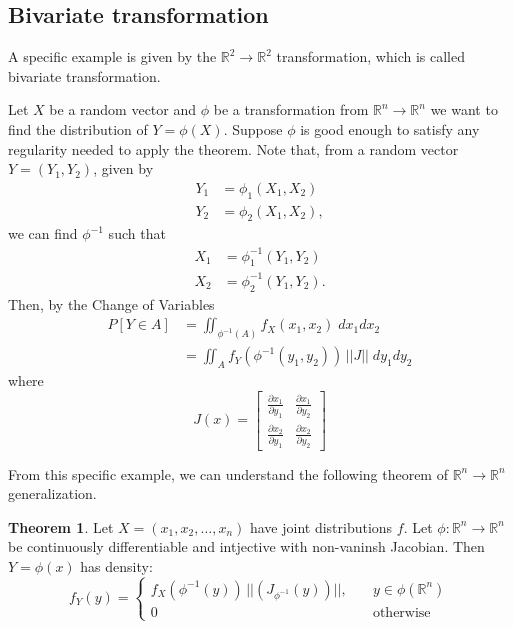 \documentclass[twoside]{article}
\theoremstyle{definition}
\newtheorem{theorem}{Theorem}[section]
\theoremstyle{remark}
\theoremstyle{remark}
\begin{document}
\subsection{Bivariate transformation}
A specific example is given by the $\mathbb{R}^2 \rightarrow \mathbb{R}^2$ transformation,
which is called bivariate transformation.

Let $X$ be a random vector and $\phi$ be a transformation from $\mathbb{R}^n \rightarrow \mathbb{R}^n$
we want to find the distribution of $Y=\phi(X)$. Suppose $\phi$ is good enough
to satisfy any regularity needed to apply the theorem.
Note that, from a random vector $Y = (Y_1, Y_2)$, given by
\begin{equation}
  \begin{split}
    Y_1 &= \phi_1(X_1, X_2) \\
    Y_2 &= \phi_2(X_1, X_2),
  \end{split}
\end{equation}
we can find $\phi^{-1}$ such that
\begin{equation}
  \begin{split}
    X_1 &= \phi^{-1}_1 (Y_1, Y_2) \\
    X_2 &= \phi^{-1}_2 (Y_1, Y_2).
  \end{split}
\end{equation}
Then, by the Change of Variables
\begin{equation}
  \begin{split}
    P[Y \in A]
    &= \iint_{\phi^{-1}(A)} f_X(x_1, x_2) \; dx_1 dx_2 \\
    &= \iint_{A} f_Y(\phi^{-1}(y_1, y_2)) \, ||J|| \; dy_1 dy_2
  \end{split}
\end{equation}
where
\begin{equation}
  J(x) =
    \begin{bmatrix}
      \frac{\partial x_1}{\partial y_1} & \frac{\partial x_1}{\partial y_2} \\
      \frac{\partial x_2}{\partial y_1} & \frac{\partial x_2}{\partial y_2}
    \end{bmatrix}
\end{equation}

From this specific example, we can understand the following theorem of
$\mathbb{R}^n \rightarrow \mathbb{R}^n$ generalization.
\begin{theorem}
  Let $X = (x_1, x_2, \ldots, x_n)$ have joint distributions $f$. Let $\phi:
  \mathbb{R}^n \rightarrow \mathbb{R}^n$ be continuously differentiable and
  intjective with non-vaninsh Jacobian. Then $Y = \phi(x)$ has density:
  \begin{equation}
    f_Y(y) = \left\{
      \begin{array}{ll}
        f_X(\phi^{-1}(y)) \, ||(J_{\phi^{-1}}(y))||, &\quad y \in \phi(\mathbb{R}^n) \\
        0                                            &\quad \textrm{otherwise}
      \end{array}
      \right.
  \end{equation}
\end{theorem}
\end{document}
